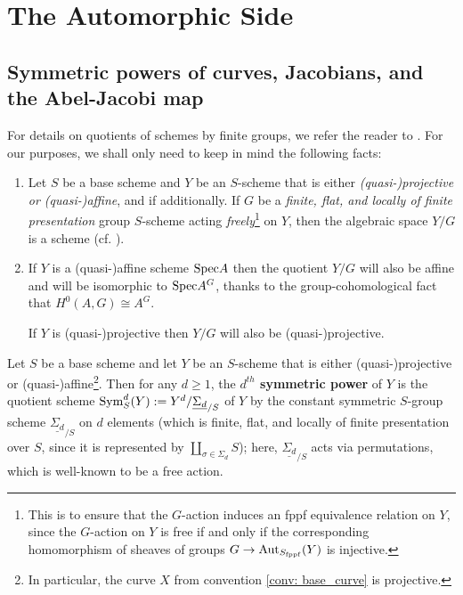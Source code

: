 \section{The Automorphic Side}
    \subsection{Symmetric powers of curves, Jacobians, and the Abel-Jacobi map}
        \begin{remark} \label{remark: quotients_of_schemes_by_finite_group_schemes}
            For details on quotients of schemes by finite groups, we refer the reader to \cite[Expos\'e V]{SGA1}. For our purposes, we shall only need to keep in mind the following facts: 
                \begin{enumerate}
                    \item Let $S$ be a base scheme and $Y$ be an $S$-scheme that is either \textit{(quasi-)projective or (quasi-)affine}, and if additionally. If $G$ be a \textit{finite, flat, and locally of finite presentation} group $S$-scheme acting \textit{freely}\footnote{This is to ensure that the $G$-action induces an fppf equivalence relation on $Y$, since the $G$-action on $Y$ is free if and only if the corresponding homomorphism of sheaves of groups $G \to \mathrm{Aut}_{S_{\mathrm{fppf}}}(Y)$ is injective.} on $Y$, then the algebraic space $Y/G$ is a scheme (cf. \cite[\href{https://stacks.math.columbia.edu/tag/07S7}{Tag 07S7}]{stacks}). 
                    \item If $Y$ is a (quasi-)affine scheme $\mathrm{Spec} A$ then the quotient $Y/G$ will also be affine and will be isomorphic to $\mathrm{Spec} A^G$, thanks to the group-cohomological fact that $H^0(A, G) \cong A^G$. 
                    
                    If $Y$ is (quasi-)projective then $Y/G$ will also be (quasi-)projective.
                \end{enumerate}
        \end{remark}
        \begin{definition} \label{def: symmetric_powers_of_schemes}
            Let $S$ be a base scheme and let $Y$ be an $S$-scheme that is either (quasi-)projective or (quasi-)affine\footnote{In particular, the curve $X$ from convention \ref{conv: base_curve} is projective.}. Then for any $d \geq 1$, the \textbf{$d^{th}$ symmetric power} of $Y$ is the quotient scheme $\mathrm{Sym}^d_S(Y) := Y^d/\underline{\Sigma_d}_{/S}$ of $Y$ by the constant symmetric $S$-group scheme $\underline{\Sigma_d}_{/S}$ on $d$ elements (which is finite, flat, and locally of finite presentation over $S$, since it is represented by $\coprod_{\sigma \in \Sigma_d} S$); here, $\underline{\Sigma_d}_{/S}$ acts via permutations, which is well-known to be a free action.
        \end{definition}
